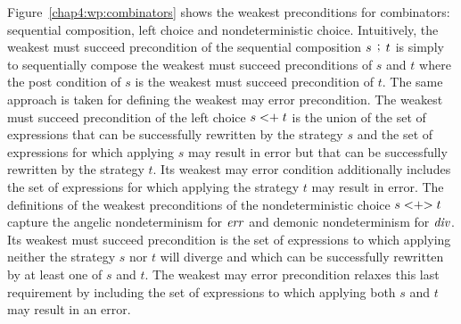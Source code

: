 Figure~\ref{chap4:wp:combinators} shows the weakest preconditions for combinators: sequential composition, left choice and nondeterministic choice. Intuitively, the weakest must succeed precondition of the sequential composition $s \, \mathrel{\mathop;} \, t$ is simply to sequentially compose the weakest must succeed preconditions of $s$ and $t$ where the post condition of $s$ is the weakest must succeed precondition of $t$. The same approach is taken for defining the weakest may error precondition. The weakest must succeed precondition of the left choice $s <\mathrel{\mathop+} t$ is the union of the set of expressions that can be successfully rewritten by the strategy $s$ and the set of expressions for which applying $s$ may result in error but that can be successfully rewritten by the strategy $t$. Its weakest may error condition additionally includes the set of expressions for which applying the strategy $t$ may result in error. The definitions of the weakest preconditions of the nondeterministic choice $s <\mathrel{\mathop+}\mathrel{\mathop>} t$ capture the angelic nondeterminism for $\mathit{err}$ and demonic nondeterminism for $\mathit{div}$. Its weakest must succeed precondition is the set of expressions to which applying neither the strategy $s$ nor $t$ will diverge and which can be successfully rewritten by at least one of $s$ and $t$. The weakest may error precondition relaxes this last requirement by including the set of expressions to which applying both $s$ and $t$ may result in an error.
